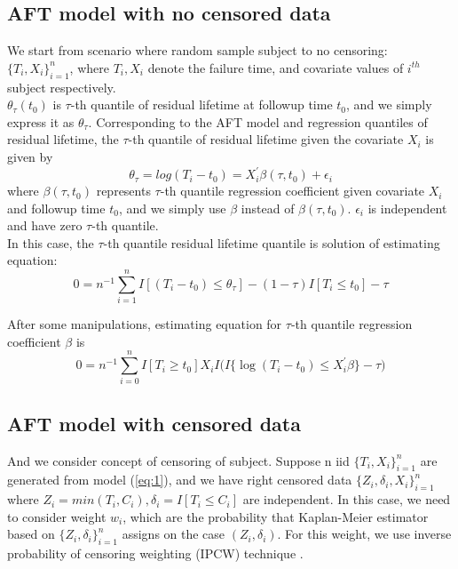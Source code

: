 \documentclass[titlepage,english,12pt]{article}
\begin{document}
\subsection{AFT model with no censored data}

	We start from scenario where random sample subject to no censoring: $\{T_i, X_i\}_{i=1}^{n}$, where $T_i, X_i$ denote the failure time, and covariate values of $i^{th}$ subject respectively.\\
		
	\noindent $\theta_{\tau}(t_0)$ is $\tau$-th quantile of residual lifetime at followup time $t_0$, and we simply express it as $\theta_{\tau}$. Corresponding to the AFT model and regression quantiles of residual lifetime, the $\tau$-th quantile of residual lifetime given the covariate $X_i$ is given by
	\begin{equation} \label{eq:1}
	\theta_{\tau}=log(T_i-t_0)=X_{i}^{\prime}\beta(\tau, t_0)+\epsilon_i
	\end{equation}
	where $\beta(\tau, t_0)$ represents $\tau$-th quantile regression coefficient given covariate $X_i$ and followup time $t_0$, and we simply use $\beta$ instead of $\beta(\tau, t_0)$. $\epsilon_i$ is independent and have zero $\tau$-th quantile.\\
	
	\noindent In this case, the $\tau$-th quantile residual lifetime quantile is solution of estimating equation:
	\begin{equation} \label{eq:2}
	0 = n^{-1}\sum_{i=1}^{n}I[(T_i-t_0)\leq\theta_{\tau}]-(1-\tau)I[T_i \leq t_0]-\tau
	\end{equation}

	\noindent After some manipulations, estimating equation for $\tau$-th quantile regression coefficient $\beta$ is
	\begin{equation} \label{eq:3}
	0 = n^{-1}\sum_{i=0}^{n}I[T_i \ge t_0] X_i I \Big(I\{\log(T_i - t_0) \leq X_i^{\prime}\beta\} - \tau \Big)
	\end{equation}

\subsection{AFT model with censored data}

	\noindent And we consider concept of censoring of subject. Suppose n iid $\{T_i, X_i\}_{i=1}^{n}$ are generated from model (\ref{eq:1}), and we have right censored data $\{Z_i, \delta_i, X_i \}_{i=1}^{n}$ where $Z_i=min(T_i,C_i), \delta_i = I[T_i \leq C_i]$ are independent. In this case, we need to consider weight $w_i$, which are the probability that Kaplan-Meier estimator based on $\{Z_i, \delta_i \}_{i=1}^{n}$ assigns on the case $(Z_i, \delta_i)$. For this weight, we use inverse probability of censoring weighting (IPCW) technique \citet{robins1992recovery}.\\
	
\end{document}

